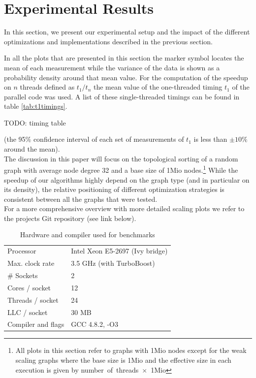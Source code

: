 \section{Experimental Results}\label{sec:exp}
%
In this section, we present our experimental setup and the impact of the different optimizations and implementations described in the previous section.
\par\medskip
%
In all the plots that are presented in this section the marker symbol locates the mean of each measurement while the variance of the data is shown as a probability density around that mean value.
For the computation of the speedup on $n$ threads defined as $t_1/t_n$ the mean value of the one-threaded timing $t_1$ of the parallel code was used.
A list of these single-threaded timings can be found in table \ref{tab:t1timings}. 
\par\medskip
{\Large TODO: timing table}
\par\medskip
(the 95\% confidence interval of each set of measurements of $t_1$ is less than $\pm 10\%$ around the mean). \\
The discussion in this paper will focus on the topological sorting of a random graph with average node degree 32 and a base size of 1Mio nodes.\footnote{All plots in this section refer to graphs with 1Mio nodes except for the weak scaling graphs where the base size is 1Mio and the effective size in each execution is given by number~of~threads~$\times$~1Mio} 
While the speedup of our algorithms highly depend on the graph type (and in particular on its density), the relative positioning of different optimization strategies is consistent between all the graphs that were tested. \\
For a more comprehensive overview with more detailed scaling plots we refer to the projects Git repository (see link below).
\par\medskip

  \begin{table}[h]
    \centering
    \begin{tabular}{ll}
    \toprule
    Processor        & Intel Xeon E5-2697 (Ivy bridge) \\
    Max. clock rate  & 3.5 GHz (with TurboBoost)\\
    \# Sockets       & 2 \\
    Cores / socket   & 12 \\
    Threads / socket & 24 \\
    LLC / socket     & 30 MB \\
    \midrule
    Compiler and flags & GCC 4.8.2, -O3\\
    \bottomrule
    \end{tabular}
    \caption{Hardware and compiler used for benchmarks}
    \label{tab:hardware}
  \end{table}
 
